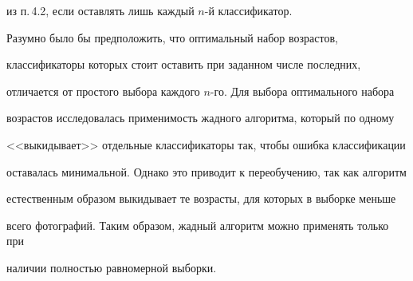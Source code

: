 из п.\,4.2, если оставлять лишь каждый $n$-й классификатор.



Разумно было бы предположить, что оптимальный набор возрастов,

классификаторы которых стоит оставить при заданном числе последних,

отличается от простого выбора каждого $n$-го. Для выбора оптимального набора

возрастов исследовалась применимость жадного алгоритма, который по одному

<<выкидывает>> отдельные классификаторы так, чтобы ошибка классификации

оставалась минимальной. Однако это приводит к переобучению, так как алгоритм

естественным образом выкидывает те возрасты, для которых в выборке меньше

всего фотографий. Таким образом, жадный алгоритм можно применять только при

наличии полностью равномерной выборки.



